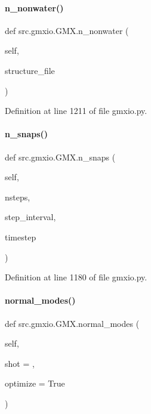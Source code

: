 \paragraph{\texorpdfstring{n\+\_\+nonwater()}{n\_nonwater()}}
{\footnotesize\ttfamily def src.\+gmxio.\+G\+M\+X.\+n\+\_\+nonwater (\begin{DoxyParamCaption}\item[{}]{self,  }\item[{}]{structure\+\_\+file }\end{DoxyParamCaption})}



Definition at line 1211 of file gmxio.\+py.

\mbox{\label{classsrc_1_1gmxio_1_1GMX_a1dd15e453829991f85a8cc4798425813}} 
\paragraph{\texorpdfstring{n\+\_\+snaps()}{n\_snaps()}}
{\footnotesize\ttfamily def src.\+gmxio.\+G\+M\+X.\+n\+\_\+snaps (\begin{DoxyParamCaption}\item[{}]{self,  }\item[{}]{nsteps,  }\item[{}]{step\+\_\+interval,  }\item[{}]{timestep }\end{DoxyParamCaption})}



Definition at line 1180 of file gmxio.\+py.

\mbox{\label{classsrc_1_1gmxio_1_1GMX_adbb731b653e4f79880ee97a67d128805}} 
\paragraph{\texorpdfstring{normal\+\_\+modes()}{normal\_modes()}}
{\footnotesize\ttfamily def src.\+gmxio.\+G\+M\+X.\+normal\+\_\+modes (\begin{DoxyParamCaption}\item[{}]{self,  }\item[{}]{shot = {},  }\item[{}]{optimize = {\ttfamily True} }\end{DoxyParamCaption})}



